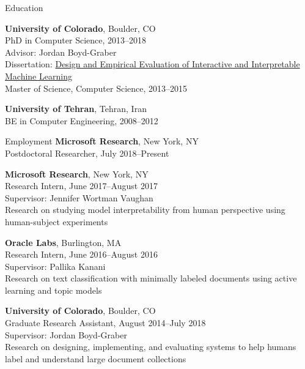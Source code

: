 \documentclass{resume} %
\begin{document}
\begin{rSection}{Education}

\textbf{University of Colorado}, Boulder, CO \\
PhD in Computer Science, 2013--2018 \\
Advisor: Jordan Boyd-Graber\\
Dissertation: \href{https://scholar.colorado.edu/csci_gradetds/163/}{Design and Empirical Evaluation of Interactive and Interpretable Machine Learning}\\
Master of Science, Computer Science, 2013--2015

\textbf{University of Tehran}, Tehran, Iran\\
BE in Computer Engineering, 2008--2012
\end{rSection}


\begin{rSection}{Employment}
\textbf{Microsoft Research}, New York, NY \\
Postdoctoral Researcher, July 2018--Present

\textbf{Microsoft Research}, New York, NY \\
Research Intern, June 2017--August 2017 \\
Supervisor: Jennifer Wortman Vaughan\\
Research on studying model interpretability from human perspective using human-subject experiments

\textbf{Oracle Labs}, Burlington, MA \\
Research Intern, June 2016--August 2016 \\
Supervisor: Pallika Kanani \\
Research on text classification with minimally labeled documents using active learning and topic models

\textbf{University of Colorado}, Boulder, CO \\
Graduate Research Assistant, August 2014--July 2018\\
Supervisor: Jordan Boyd-Graber\\
Research on designing, implementing, and evaluating systems to help humans label and understand large document collections\\
\\
\\
\\
\end{rSection}
\end{document}
